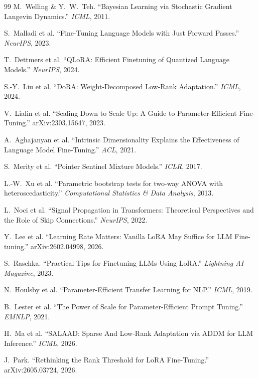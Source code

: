 \documentclass[11pt]{article}
\begin{document}
\begin{thebibliography}{99}
 M.~Welling \& Y.~W.~Teh. ``Bayesian Learning via Stochastic Gradient Langevin Dynamics.'' \textit{ICML}, 2011.

 S.~Malladi et al. ``Fine-Tuning Language Models with Just Forward Passes.'' \textit{NeurIPS}, 2023.

 T.~Dettmers et al. ``QLoRA: Efficient Finetuning of Quantized Language Models.'' \textit{NeurIPS}, 2024.

 S.-Y.~Liu et al. ``DoRA: Weight-Decomposed Low-Rank Adaptation.'' \textit{ICML}, 2024.

 V.~Lialin et al. ``Scaling Down to Scale Up: A Guide to Parameter-Efficient Fine-Tuning.'' arXiv:2303.15647, 2023.

 A.~Aghajanyan et al. ``Intrinsic Dimensionality Explains the Effectiveness of Language Model Fine-Tuning.'' \textit{ACL}, 2021.

 S.~Merity et al. ``Pointer Sentinel Mixture Models.'' \textit{ICLR}, 2017.

 L.-W.~Xu et al. ``Parametric bootstrap tests for two-way ANOVA with heteroscedasticity.'' \textit{Computational Statistics \& Data Analysis}, 2013.

 L.~Noci et al. ``Signal Propagation in Transformers: Theoretical Perspectives and the Role of Skip Connections.'' \textit{NeurIPS}, 2022.

 Y.~Lee et al. ``Learning Rate Matters: Vanilla LoRA May Suffice for LLM Fine-tuning.'' arXiv:2602.04998, 2026.

 S.~Raschka. ``Practical Tips for Finetuning LLMs Using LoRA.'' \textit{Lightning AI Magazine}, 2023.

 N.~Houlsby et al. ``Parameter-Efficient Transfer Learning for NLP.'' \textit{ICML}, 2019.

 B.~Lester et al. ``The Power of Scale for Parameter-Efficient Prompt Tuning.'' \textit{EMNLP}, 2021.

 H.~Ma et al. ``SALAAD: Sparse And Low-Rank Adaptation via ADDM for LLM Inference.'' \textit{ICML}, 2026.

 J.~Park. ``Rethinking the Rank Threshold for LoRA Fine-Tuning.'' arXiv:2605.03724, 2026.


\end{thebibliography}
\end{document}
